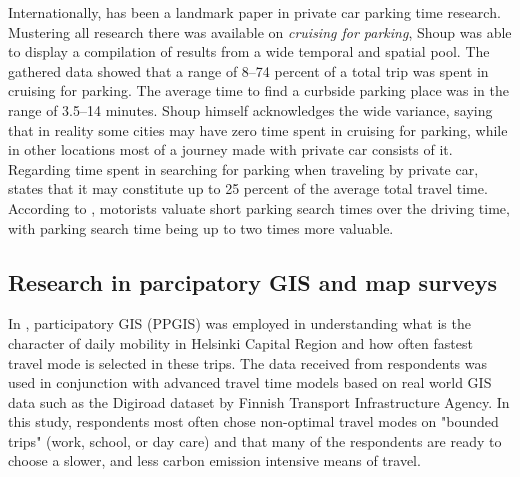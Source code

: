 Internationally,  has been a landmark paper in private car parking time research. Mustering all research there was available on \textit{cruising for parking}, Shoup was able to display a compilation of results from a wide temporal and spatial pool. The gathered data showed that a range of 8--74 percent of a total trip was spent in cruising for parking. The average time to find a curbside parking place was in the range of 3.5--14 minutes. Shoup himself acknowledges the wide variance, saying that in reality some cities may have zero time spent in cruising for parking, while in other locations most of a journey made with private car consists of it. Regarding time spent in searching for parking when traveling by private car,  states that it may constitute up to 25 percent of the average total travel time. According to , motorists valuate short parking search times over the driving time, with parking search time being up to two times more valuable. 

\newpage
\subsection{Research in parcipatory GIS and map surveys}
\justify


In , participatory GIS (PPGIS) was employed in understanding what is the character of daily mobility in Helsinki Capital Region and how often fastest travel mode is selected in these trips. The data received from respondents was used in conjunction with advanced travel time models based on real world GIS data such as the Digiroad dataset by Finnish Transport Infrastructure Agency. In this study, respondents most often chose non-optimal travel modes on "bounded trips" (work, school, or day care) and that many of the respondents are ready to choose a slower, and less carbon emission intensive means of travel.

